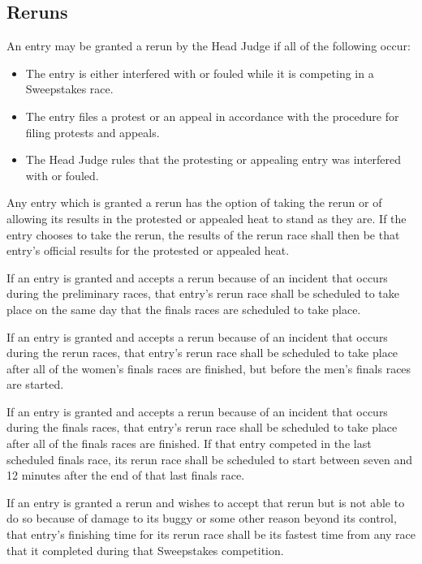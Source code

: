 \subsection{Reruns}

	An entry may be granted a rerun by the Head Judge if all of the following occur:

	\begin{itemize}

		\item The entry is either interfered with or fouled while it is competing in a Sweepstakes race.

		\item The entry files a protest or an appeal in accordance with the procedure for filing protests and appeals.

		\item The Head Judge rules that the protesting or appealing entry was interfered with or fouled.

	\end{itemize}

	Any entry which is granted a rerun has the option of taking the rerun or of allowing its results in the protested or appealed heat to stand as they are. If the entry chooses to take the rerun, the results of the rerun race shall then be that entry's official results for the protested or appealed heat.

	If an entry is granted and accepts a rerun because of an incident that occurs during the preliminary races, that entry's rerun race shall be scheduled to take place on the same day that the finals races are scheduled to take place.

	If an entry is granted and accepts a rerun because of an incident that occurs during the rerun races, that entry's rerun race shall be scheduled to take place after all of the women's finals races are finished, but before the men's finals races are started.

	If an entry is granted and accepts a rerun because of an incident that occurs during the finals races, that entry's rerun race shall be scheduled to take place after all of the finals races are finished. If that entry competed in the last scheduled finals race, its rerun race shall be scheduled to start between seven and 12 minutes after the end of that last finals race.

	If an entry is granted a rerun and wishes to accept that rerun but is not able to do so because of damage to its buggy or some other reason beyond its control, that entry's finishing time for its rerun race shall be its fastest time from any race that it completed during that Sweepstakes competition.


